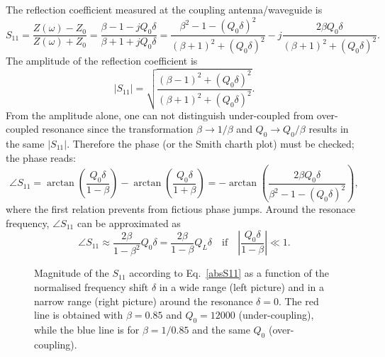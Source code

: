 \documentclass[aps,onecolumn,floatfix,superscriptaddress,a4]{revtex4}
\begin{document}
The reflection coefficient measured at the coupling antenna/waveguide is 
\begin{equation}
S_{11}=\frac{Z(\omega)-Z_0}{Z(\omega)+Z_0}
=\frac{\beta - 1 - j Q_0 \delta}{\beta + 1 + j Q_0 \delta}=
\frac{\beta^2-1-(Q_0 \delta)^2}{(\beta+1)^2+(Q_0 \delta)^2}-
      j\frac{2 \beta Q_0 \delta}{(\beta+1)^2+(Q_0 \delta)^2}.
\label{S11}
\end{equation}
The amplitude of the reflection coefficient is
\begin{equation}
\left|S_{11}\right|=\sqrt{\frac{(\beta-1)^2+(Q_0 \delta)^2}{(\beta+1)^2+(Q_0 \delta)^2}}.
\label{absS11}
\end{equation}
From the amplitude alone, one can not distinguish under-coupled from over-coupled resonance
since the transformation $\beta \to 1/\beta$ and $Q_0 \to Q_0/\beta$ results in the same 
$\left| S_{11} \right|$. Therefore the phase (or the Smith charth plot) must be checked; the
phase reads:
\begin{equation}
\angle S_{11}=
\arctan{\left(\frac{Q_0 \delta}{1-\beta}\right)}-\arctan{\left(\frac{Q_0 \delta}{1+\beta} \right)}
=-\arctan{\left(\frac{2\beta Q_0 \delta}{\beta^2-1-(Q_0 \delta)^2}\right)},
\label{angleS11}
\end{equation}
where the first relation prevents from fictious phase jumps. Around the resonace frequency,
$\angle S_{11}$ can be approximated as
\begin{equation}
\angle S_{11}\approx
\frac{2 \beta}{1-\beta^2} Q_0 \delta = \frac{2 \beta}{1-\beta} Q_L \delta
\quad\mbox{if}\quad
\left|\frac{Q_0\delta}{1-\beta}\right|\ll 1.
\label{angleS11approx}
\end{equation}

\begin{figure}[!htbp]
\label{fig:absS11}
\centering
{}
\caption{
Magnitude of the $S_{11}$ according to Eq.~\ref{absS11} as a function of the normalised
frequency shift $\delta$ in a wide range (left picture) and in a narrow range (right picture)
around the resonance $\delta=0$. The red line is obtained with $\beta=0.85$ and $Q_0=12000$
(under-coupling), while the blue line is for $\beta=1/0.85$ and the same $Q_0$ (over-coupling).}
\end{figure}
\end{document}
